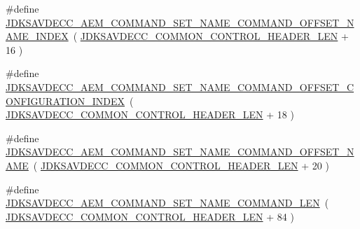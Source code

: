 \begin{DoxyCompactItemize}
\item 
\#define \hyperlink{group__command__set__name_gab1be74b24a05b43ce1ae08d115853e31}{J\+D\+K\+S\+A\+V\+D\+E\+C\+C\+\_\+\+A\+E\+M\+\_\+\+C\+O\+M\+M\+A\+N\+D\+\_\+\+S\+E\+T\+\_\+\+N\+A\+M\+E\+\_\+\+C\+O\+M\+M\+A\+N\+D\+\_\+\+O\+F\+F\+S\+E\+T\+\_\+\+N\+A\+M\+E\+\_\+\+I\+N\+D\+EX}~( \hyperlink{group__jdksavdecc__avtp__common__control__header_gaae84052886fb1bb42f3bc5f85b741dff}{J\+D\+K\+S\+A\+V\+D\+E\+C\+C\+\_\+\+C\+O\+M\+M\+O\+N\+\_\+\+C\+O\+N\+T\+R\+O\+L\+\_\+\+H\+E\+A\+D\+E\+R\+\_\+\+L\+EN} + 16 )
\item 
\#define \hyperlink{group__command__set__name_ga7d32abc0f1e55cc2abec3129d567f9ec}{J\+D\+K\+S\+A\+V\+D\+E\+C\+C\+\_\+\+A\+E\+M\+\_\+\+C\+O\+M\+M\+A\+N\+D\+\_\+\+S\+E\+T\+\_\+\+N\+A\+M\+E\+\_\+\+C\+O\+M\+M\+A\+N\+D\+\_\+\+O\+F\+F\+S\+E\+T\+\_\+\+C\+O\+N\+F\+I\+G\+U\+R\+A\+T\+I\+O\+N\+\_\+\+I\+N\+D\+EX}~( \hyperlink{group__jdksavdecc__avtp__common__control__header_gaae84052886fb1bb42f3bc5f85b741dff}{J\+D\+K\+S\+A\+V\+D\+E\+C\+C\+\_\+\+C\+O\+M\+M\+O\+N\+\_\+\+C\+O\+N\+T\+R\+O\+L\+\_\+\+H\+E\+A\+D\+E\+R\+\_\+\+L\+EN} + 18 )
\item 
\#define \hyperlink{group__command__set__name_gaac9fb6a76459a22de43bbec2e609b1c7}{J\+D\+K\+S\+A\+V\+D\+E\+C\+C\+\_\+\+A\+E\+M\+\_\+\+C\+O\+M\+M\+A\+N\+D\+\_\+\+S\+E\+T\+\_\+\+N\+A\+M\+E\+\_\+\+C\+O\+M\+M\+A\+N\+D\+\_\+\+O\+F\+F\+S\+E\+T\+\_\+\+N\+A\+ME}~( \hyperlink{group__jdksavdecc__avtp__common__control__header_gaae84052886fb1bb42f3bc5f85b741dff}{J\+D\+K\+S\+A\+V\+D\+E\+C\+C\+\_\+\+C\+O\+M\+M\+O\+N\+\_\+\+C\+O\+N\+T\+R\+O\+L\+\_\+\+H\+E\+A\+D\+E\+R\+\_\+\+L\+EN} + 20 )
\item 
\#define \hyperlink{group__command__set__name_ga133a28cbd2bc0e77c69d8135f36324f6}{J\+D\+K\+S\+A\+V\+D\+E\+C\+C\+\_\+\+A\+E\+M\+\_\+\+C\+O\+M\+M\+A\+N\+D\+\_\+\+S\+E\+T\+\_\+\+N\+A\+M\+E\+\_\+\+C\+O\+M\+M\+A\+N\+D\+\_\+\+L\+EN}~( \hyperlink{group__jdksavdecc__avtp__common__control__header_gaae84052886fb1bb42f3bc5f85b741dff}{J\+D\+K\+S\+A\+V\+D\+E\+C\+C\+\_\+\+C\+O\+M\+M\+O\+N\+\_\+\+C\+O\+N\+T\+R\+O\+L\+\_\+\+H\+E\+A\+D\+E\+R\+\_\+\+L\+EN} + 84 )
\end{DoxyCompactItemize}
